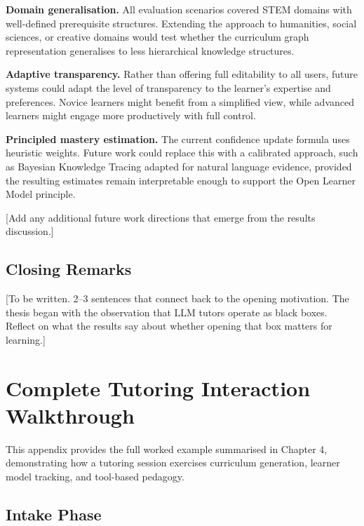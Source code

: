 \documentclass[logo,bsc,singlespacing,parskip,online]{infthesis}
\begin{document}
\textbf{Domain generalisation.} All evaluation scenarios covered STEM domains with well-defined prerequisite structures. Extending the approach to humanities, social sciences, or creative domains would test whether the curriculum graph representation generalises to less hierarchical knowledge structures.

\textbf{Adaptive transparency.} Rather than offering full editability to all users, future systems could adapt the level of transparency to the learner's expertise and preferences. Novice learners might benefit from a simplified view, while advanced learners might engage more productively with full control.

\textbf{Principled mastery estimation.} The current confidence update formula uses heuristic weights. Future work could replace this with a calibrated approach, such as Bayesian Knowledge Tracing adapted for natural language evidence, provided the resulting estimates remain interpretable enough to support the Open Learner Model principle.

[Add any additional future work directions that emerge from the results discussion.]

\section{Closing Remarks}

[To be written. 2--3 sentences that connect back to the opening motivation. The thesis began with the observation that LLM tutors operate as black boxes. Reflect on what the results say about whether opening that box matters for learning.]

% 




\appendix

\chapter{Complete Tutoring Interaction Walkthrough}
\label{appendix:walkthrough}

This appendix provides the full worked example summarised in Chapter 4, demonstrating how a tutoring session exercises curriculum generation, learner model tracking, and tool-based pedagogy.

\section{Intake Phase}
\end{document}
